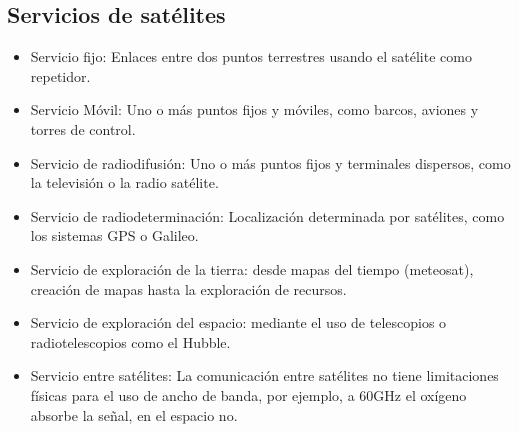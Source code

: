 	\subsection{Servicios de satélites}
	\label{sub:serviciosSat}
		\begin{itemize}
			\item Servicio fijo: Enlaces entre dos puntos terrestres usando el satélite como repetidor.
			\item Servicio Móvil: Uno o más puntos fijos y móviles, como barcos, aviones y torres de control.
			\item Servicio de radiodifusión: Uno o más puntos fijos y terminales dispersos, como la televisión o la radio satélite.
			\item Servicio de radiodeterminación: Localización determinada por satélites, como los sistemas GPS o Galileo.
			\item Servicio de exploración de la tierra: desde mapas del tiempo (meteosat), creación de mapas hasta la exploración de recursos.
			\item Servicio de exploración del espacio: mediante el uso de telescopios o radiotelescopios como el Hubble.
			\item Servicio entre satélites: La comunicación entre satélites no tiene limitaciones físicas para el uso de ancho de banda, por ejemplo, a 60GHz el oxígeno absorbe la señal, en el espacio no.
		\end{itemize}
